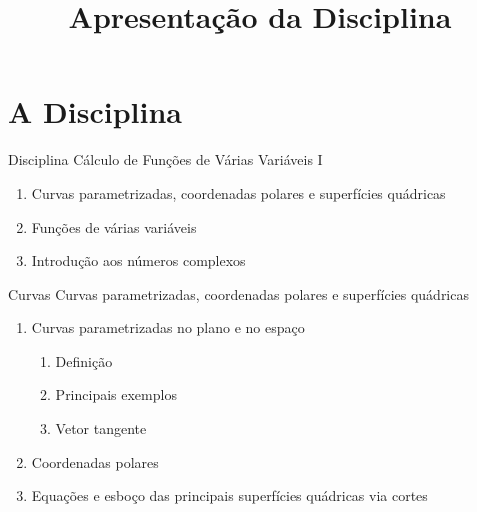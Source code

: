 
\usepackage{calculo_varias_variaveis-1}

\title{Apresentação da Disciplina}



\addtitle

\section{A Disciplina}

\begin{frame}{Disciplina}
  Cálculo de Funções de Várias Variáveis I
  \begin{enumerate}[<+->]
    \item Curvas parametrizadas, coordenadas polares e superfícies quádricas
    \item Funções de várias variáveis
    \item Introdução aos números complexos
  \end{enumerate}
\end{frame}

\begin{frame}{Curvas}
  Curvas parametrizadas, coordenadas polares e superfícies quádricas
  \begin{enumerate}[<+->]
    \item Curvas parametrizadas no plano e no espaço
    \begin{enumerate}
      \item Definição
      \item Principais exemplos
      \item Vetor tangente
    \end{enumerate}
    \item Coordenadas polares
    \item Equações e esboço das principais superfícies quádricas via cortes
  \end{enumerate}
\end{frame}

